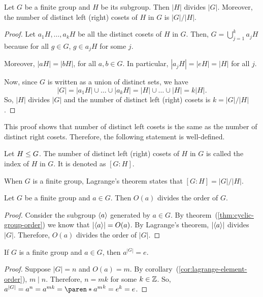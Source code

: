 \documentclass[11pt]{penrose}
\begin{document}
\begin{nthm}[Lagrange]
    Let $G$ be a finite group and $H$ be its subgroup. Then $|H|$ divides $|G|$. Moreover, the number of distinct left (right) cosets of $H$ in $G$ is $|G|/|H|$.
\end{nthm}
\begin{proof}
    Let $a_1 H, \dots, a_k H$ be all the distinct cosets of $H$ in $G$. Then, $G = \bigcup_{j=1}^{k} a_j H$ because for all $g \in G$, $g \in a_j H$ for some $j$.

    Moreover, $|aH| = |bH|$, for all $a, b \in G$. In particular, $|a_j H| = |e H| = |H|$ for all $j$.

    Now, since $G$ is written as a union of distinct sets, we have
    \begin{equation*}
        |G| = |a_1 H| \cup \dots \cup |a_k H| = |H| \cup \dots \cup |H| = k |H|.
    \end{equation*}
    So, $|H|$ divides $|G|$ and the number of distinct left (right) cosets is $k = |G|/|H|$.
\end{proof}

This proof shows that number of distinct left cosets is the same as the number of distinct right cosets. Therefore, the following statement is well-defined.

\begin{ndfn}
    Let $H \mathrel{\leq} G$. The number of distinct left (right) cosets of $H$ in $G$ is called the index of $H$ in $G$. It is denoted as $[G:H]$.
\end{ndfn}

When $G$ is a finite group, Lagrange's theorem states that $[G:H] = |G|/|H|$.

\begin{ncor}\label{cor:lagrange-element-order}
    Let $G$ be a finite group and $a \in G$. Then $O(a)$ divides the order of $G$.
\end{ncor}
\begin{proof}
    Consider the subgroup $\langle a\rangle$ generated by $a \in G$. By theorem~(\ref{thm:cyclic-group-order}) we know that $|\langle a\rangle| = O(a)$. By Lagrange's theorem, $|\langle a\rangle|$ divides $|G|$. Therefore, $O(a)$ divides the order of $|G|$.
\end{proof}

\begin{ncor}
    If $G$ is a finite group and $a \in G$, then $a^{|G|} = e$.
\end{ncor}
\begin{proof}
    Suppose $|G| = n$ and $O(a) = m$. By corollary~(\ref{cor:lagrange-element-order}), $m \mid n$. Therefore, $n = mk$ for some $k \in \mathbb{Z}$. So, $a^{|G|} = a^n = a^{mk} = \paren*{a^{m}}^{k} = e^k = e$.
\end{proof}
\end{document}
